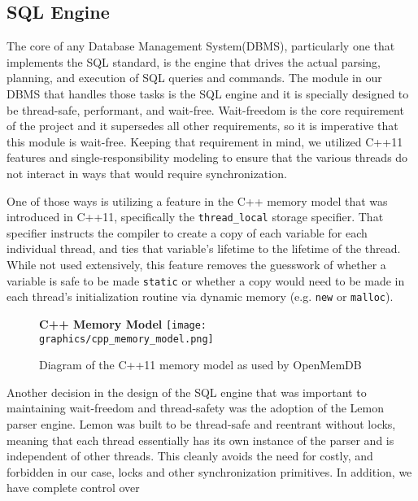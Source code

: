 \documentclass[letterpaper, 12pt]{article}
\begin{document}
  \subsection{SQL Engine}
  The core of any Database Management System(DBMS), particularly one that implements the SQL standard, is the
  engine that drives the actual parsing, planning, and execution of SQL queries and commands.
  The module in our DBMS that handles those tasks is the SQL engine and it is specially designed to
  be thread-safe, performant, and wait-free. Wait-freedom is the core requirement of the project
  and it supersedes all other requirements, so it is imperative that this module is wait-free. Keeping
  that requirement in mind, we utilized C++11 features and single-responsibility modeling to
  ensure that the various threads do not interact in ways that would require synchronization.
  \par\vspace{\baselineskip}
  One of those ways is utilizing a feature in the C++ memory model that was introduced in C++11, specifically
  the \lstinline|thread_local| storage specifier. That specifier instructs the compiler
  to create a copy of each variable for each individual thread, and ties that variable's lifetime
  to the lifetime of the thread. While not used extensively, this feature removes the guesswork
  of whether a variable is safe to be made \lstinline|static| or whether a copy
  would need to be made in each thread's initialization routine via dynamic memory (e.g.
  \lstinline|new| or \lstinline|malloc|).
  \par\vspace{\baselineskip}
  \begin{figure}
   \centering
    \textbf{C++ Memory Model}
    \texttt{[image: graphics/cpp\_memory\_model.png]}
    \caption{Diagram of the C++11 memory model as used by OpenMemDB}
  \end{figure}
  \par\vspace{\baselineskip}
  Another decision in the design of the SQL engine that was important to maintaining wait-freedom and
  thread-safety was the adoption of the Lemon parser engine. Lemon was built to be thread-safe and
  reentrant without locks, meaning that each thread essentially has its own instance of the parser
  and is independent of other threads. This cleanly avoids the need for costly, and forbidden
  in our case, locks and other synchronization primitives. In addition, we have complete control over
\end{document}
